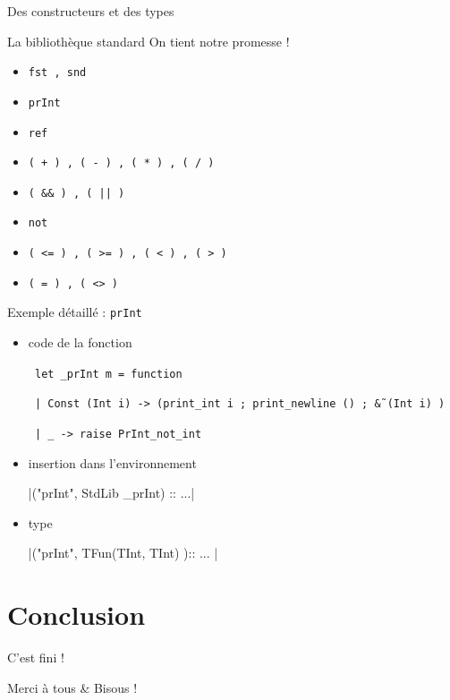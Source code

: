 \documentclass{beamer}
\begin{document}
\begin{frame}{Des constructeurs et des types}
  
\end{frame}



\begin{frame}{La bibliothèque standard}
  On tient notre promesse !

  \begin{itemize}
  \item \texttt{fst , snd}
  \item \texttt{prInt}
  \item \texttt{ref}
  \item \texttt{( + ) , ( - ) , ( * ) , ( / )}
  \item \texttt{( \&\& ) ,  ( || )}
  \item \texttt{not}
  \item \texttt{( <= ) , ( >= ) , ( < ) , ( > )}
  \item \texttt{( = ) , ( <> )}
  \end{itemize}
\end{frame}

\begin{frame}{Exemple détaillé : \texttt{prInt}}
  \begin{itemize}
  \item code de la fonction

    \texttt{ let \_prInt m = function }

    \texttt{ | Const (Int i) -> (print\_int i ; print\_newline () ; \~\& (Int i) ) }

    \texttt{ | \_ -> raise PrInt\_not\_int }

  \item insertion dans l'environnement

    |("prInt", StdLib _prInt) :: ...|

  \item type

    |("prInt", TFun(TInt, TInt) ):: ... |


  \end{itemize}
  \end{frame}

\section{Conclusion}
\begin{frame}{C'est fini !}
  \begin{center}
    \Huge Merci à tous \& Bisous !
  \end{center}
\end{frame}

\begin{frame}
  \begin{center}
    \fontsize{2}{2} \selectfont
    
  \end{center}
\end{frame}
\end{document}
